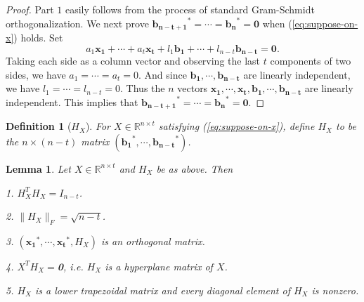 \documentclass{sig-alternate}
\newtheorem{lem}[theorem]{Lemma}
\newtheorem{defn}[theorem]{Definition}
\numberwithin{theorem}{section} \numberwithin{equation}{section}
\begin{document}
\begin{proof}
Part $1$ easily follows from the process of standard Gram-Schmidt
orthogonalization. We next prove $\mathbf{b_{n-t+1}}^* = \cdots =
\mathbf{b_{n}}^* = \textbf{0}$ when  (\ref{eq:suppose-on-x}) holds.
Set
\[
a_1\mathbf{x_1} + \cdots + a_t\mathbf{x_t} + l_1\mathbf{b_1} +
\cdots + l_{n-t}\mathbf{b_{n-t}} = \textbf{0}.
\]
Taking each side as a column vector and observing the last $t$
components of two sides, we have $a_1 = \cdots = a_t = 0$. And since
$\mathbf{b_1}, \cdots, \mathbf{b_{n-t}}$ are linearly independent,
we have $l_1 = \cdots = l_{n-t} = 0$. Thus the $n$ vectors
$\mathbf{x_1}, \cdots, \mathbf{x_t}, \mathbf{b_1}, \cdots,
\mathbf{b_{n-t}}$ are linearly independent. This implies that
$\mathbf{b_{n-t+1}}^* = \cdots = \mathbf{b_{n}}^* = \textbf{0}$.
\end{proof}





\begin{defn}[$H_X$]
\label{def:H_X} For $X\in\mathbb{R}^{n\times t}$ satisfying
(\ref{eq:suppose-on-x}), define $H_{X}$ to be the $n\times (n-t)$ matrix $(\mathbf{b_1}^*,
\cdots, \mathbf{b_{n-t}}^*)$.
\end{defn}

\begin{lem}\label{lem:property-of-Hx}
Let $X\in\mathbb{R}^{n\times t}$ and $H_{X}$ be as above. Then


1. $H_{X}^T H_{X} = I_{n-t}$.


2. $\|H_{X}\|_F = \sqrt{n-t}$.


3. $(\mathbf{x_1}^*, \cdots, \mathbf{x_t}^*, H_{X})$ is an
orthogonal matrix.

4. $X^T H_{X} = $\textbf{0}, i.e. $H_{X}$ is a hyperplane matrix of
$X$.





5. $H_{X}$ is a lower trapezoidal matrix and every diagonal element
of $H_{X}$ is nonzero.
\end{lem}
\end{document}
